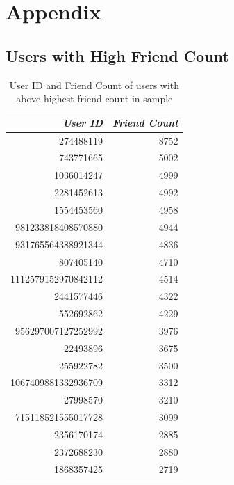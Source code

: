 \documentclass[11pt]{article}
\begin{document}
\section{Appendix}
\label{sec:orgdf833d6}
\subsection{Users with High Friend Count}
\label{sec:orgbbdc172}

\begin{table}[htbp]
\caption{\label{tab:org876095a}User ID and Friend Count of users with above highest friend count in sample}
\centering
\begin{tabular}{rr}
\textbf{\emph{User ID}} & \textbf{\emph{Friend Count}}\\
\hline
274488119 & 8752\\
743771665 & 5002\\
1036014247 & 4999\\
2281452613 & 4992\\
1554453560 & 4958\\
981233818408570880 & 4944\\
931765564388921344 & 4836\\
807405140 & 4710\\
1112579152970842112 & 4514\\
2441577446 & 4322\\
552692862 & 4229\\
956297007127252992 & 3976\\
22493896 & 3675\\
255922782 & 3500\\
1067409881332936709 & 3312\\
27998570 & 3210\\
715118521555017728 & 3099\\
2356170174 & 2885\\
2372688230 & 2880\\
1868357425 & 2719\\
\end{tabular}
\end{table}
\end{document}
